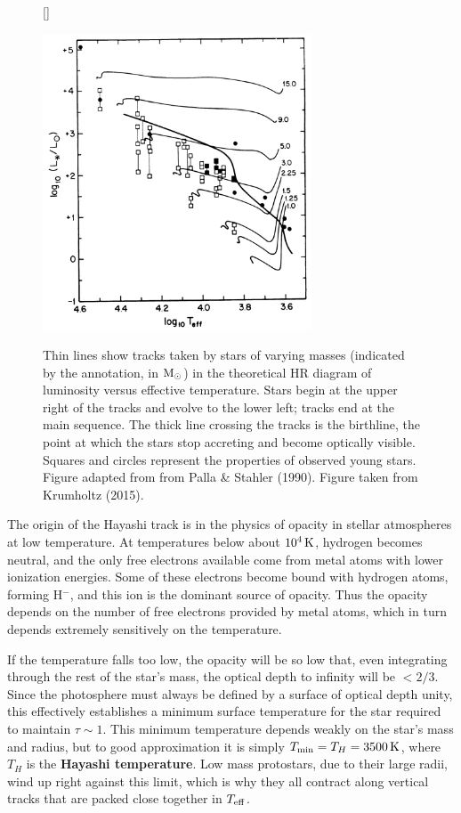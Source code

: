\documentclass[a4paper,10pt]{article}
\begin{document}
\begin{figure}[t]
    [\FBwidth]
    {\caption{\footnotesize{Thin lines show tracks taken by stars of varying masses (indicated by the annotation, in ${\rm M_\odot}$) in the theoretical HR diagram of luminosity versus effective temperature. Stars begin at the upper right of the tracks and evolve to the lower left; tracks end at the main sequence. The thick line crossing the tracks is the birthline, the point at which the stars stop accreting and become optically visible. Squares and circles represent the properties of observed young stars. Figure adapted from from Palla \& Stahler (1990). Figure taken from Krumholtz (2015).}}
    \label{fig:birthline}}
    {\includegraphics[width=8cm]{figures/birthline.png}}
\end{figure}

{\noindent}The origin of the Hayashi track is in the physics of opacity in stellar atmospheres at low temperature. At temperatures below about $10^4\,{\rm K}$, hydrogen becomes neutral, and the only free electrons available come from metal atoms with lower ionization energies. Some of these electrons become bound with hydrogen atoms, forming H$^-$, and this ion is the dominant source of opacity. Thus the opacity depends on the number of free electrons provided by metal atoms, which in turn depends extremely sensitively on the temperature.

{\noindent}If the temperature falls too low, the opacity will be so low that, even integrating through the rest of the star's mass, the optical depth to infinity will be $<2/3$. Since the photosphere must always be defined by a surface of optical depth unity, this effectively establishes a minimum surface temperature for the star required to maintain $\tau\sim1$. This minimum temperature depends weakly on the star's mass and radius, but to good approximation it is simply $T_{\rm min}=T_H=3500\,{\rm K}$, where $T_H$ is the \textbf{Hayashi temperature}. Low mass protostars, due to their large radii, wind up right against this limit, which is why they all contract along vertical tracks that are packed close together in $T_{\rm eff}$.
\end{document}
